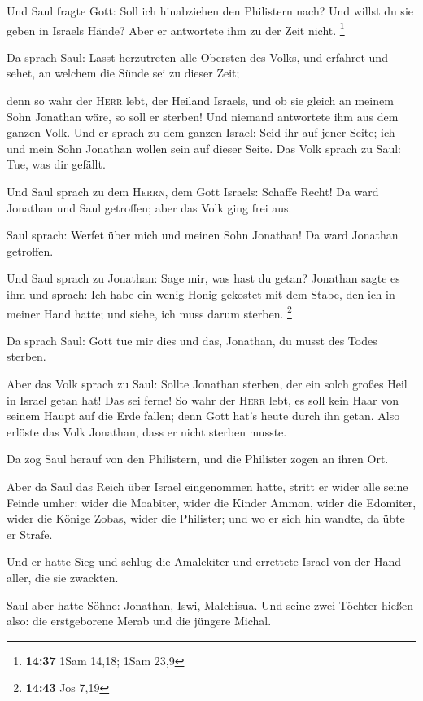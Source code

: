  Und Saul fragte Gott: Soll ich hinabziehen den
Philistern nach? Und willst du sie geben in Israels Hände? Aber er
antwortete ihm zu der Zeit nicht. \footnote{\textbf{14:37} 1Sam 14,18;
  1Sam 23,9}

 Da sprach Saul: Lasst herzutreten alle Obersten des
Volks, und erfahret und sehet, an welchem die Sünde sei zu dieser Zeit;

 denn so wahr der \textsc{Herr} lebt, der Heiland
Israels, und ob sie gleich an meinem Sohn Jonathan wäre, so soll er
sterben! Und niemand antwortete ihm aus dem ganzen Volk. 
Und er sprach zu dem ganzen Israel: Seid ihr auf jener Seite; ich und
mein Sohn Jonathan wollen sein auf dieser Seite. Das Volk sprach zu
Saul: Tue, was dir gefällt.

 Und Saul sprach zu dem \textsc{Herrn}, dem Gott Israels:
Schaffe Recht! Da ward Jonathan und Saul getroffen; aber das Volk ging
frei aus.

 Saul sprach: Werfet über mich und meinen Sohn Jonathan!
Da ward Jonathan getroffen.

 Und Saul sprach zu Jonathan: Sage mir, was hast du
getan? Jonathan sagte es ihm und sprach: Ich habe ein wenig Honig
gekostet mit dem Stabe, den ich in meiner Hand hatte; und siehe, ich
muss darum sterben. \footnote{\textbf{14:43} Jos 7,19}

 Da sprach Saul: Gott tue mir dies und das, Jonathan, du
musst des Todes sterben.

 Aber das Volk sprach zu Saul: Sollte Jonathan sterben,
der ein solch großes Heil in Israel getan hat! Das sei ferne! So wahr
der \textsc{Herr} lebt, es soll kein Haar von seinem Haupt auf die Erde
fallen; denn Gott hat's heute durch ihn getan. Also erlöste das Volk
Jonathan, dass er nicht sterben musste.

 Da zog Saul herauf von den Philistern, und die Philister
zogen an ihren Ort.

 Aber da Saul das Reich über Israel eingenommen hatte,
stritt er wider alle seine Feinde umher: wider die Moabiter, wider die
Kinder Ammon, wider die Edomiter, wider die Könige Zobas, wider die
Philister; und wo er sich hin wandte, da übte er Strafe.

 Und er hatte Sieg und schlug die Amalekiter und
errettete Israel von der Hand aller, die sie zwackten.

 Saul aber hatte Söhne: Jonathan, Iswi, Malchisua. Und
seine zwei Töchter hießen also: die erstgeborene Merab und die jüngere
Michal.


